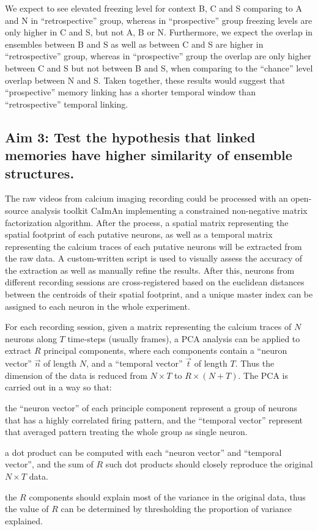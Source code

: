 \documentclass[master.tex]{subfiles}
\begin{document}
We expect to see elevated freezing level for context B, C and S comparing to A
and N in ``retrospective'' group, whereas in ``prospective'' group freezing
levels are only higher in C and S, but not A, B or N. Furthermore, we expect the
overlap in ensembles between B and S as well as between C and S are higher in
``retrospective'' group, whereas in ``prospective'' group the overlap are only
higher between C and S but not between B and S, when comparing to the ``chance''
level overlap between N and S. Taken together, these results would suggest that
``prospective'' memory linking has a shorter temporal window than
``retrospective'' temporal linking.

\subsection*{Aim 3: Test the hypothesis that linked memories have higher
  similarity of ensemble structures.}
The raw videos from calcium imaging recording could be processed with an
open-source analysis toolkit CaImAn implementing a constrained non-negative
matrix factorization algorithm. After the process, a spatial matrix representing
the spatial footprint of each putative neurons, as well as a temporal matrix
representing the calcium traces of each putative neurons will be extracted from
the raw data. A custom-written script is used to visually assess the accuracy of
the extraction as well as manually refine the results. After this, neurons from
different recording sessions are cross-registered based on the euclidean
distances between the centroids of their spatial footprint, and a unique master
index can be assigned to each neuron in the whole experiment.

For each recording session, given a matrix representing the calcium traces of
$N$ neurons along $T$ time-steps (usually frames), a PCA analysis can be applied
to extract $R$ principal components, where each components contain a ``neuron
vector'' $\vec{n}$ of length $N$, and a ``temporal vector'' $\vec{t}$ of length
$T$. Thus the dimension of the data is reduced from $N \times T$ to $R \times (N
+ T)$. The PCA is carried out in a way so that:
\begin{inparaenum}[a)]
\item the ``neuron vector'' of each principle component represent a group of
  neurons that has a highly correlated firing pattern, and the ``temporal
  vector'' represent that averaged pattern treating the whole group as single
  neuron.
\item a dot product can be computed with each ``neuron vector'' and ``temporal
  vector'', and the sum of $R$ such dot products should closely reproduce the
  original $N \times T$ data.
\item the $R$ components should explain most of the variance in the original
  data, thus the value of $R$ can be determined by thresholding the proportion
  of variance explained.
\end{inparaenum}
\end{document}
